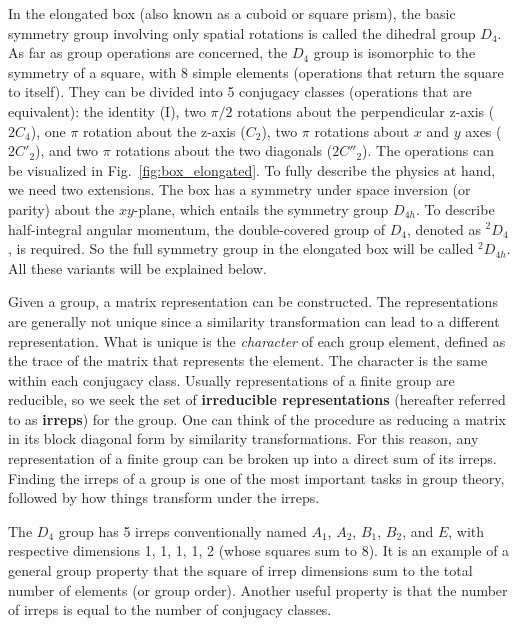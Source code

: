 \documentclass[aps,prd,reprint,showpacs,floatfix,longbibliography,,superscriptaddress]{revtex4-1}
\begin{document}
\begin{widetext}
In the elongated box (also known as a cuboid or square prism), 
the basic symmetry group involving only spatial rotations 
is called the dihedral group $D_4$. As far as group operations are concerned, 
the $D_4$ group is isomorphic to the symmetry of a square, with 8 simple elements (operations that 
return the square to itself). They can be divided into 5 conjugacy classes (operations that are equivalent): 
the identity (I), 
two $\pi/2$ rotations about the perpendicular z-axis ($2 C_4$), 
one $\pi$ rotation about the z-axis ($C_2$),  
two $\pi$  rotations about $x$ and $y$ axes ($2C'_2$), 
and  two $\pi$  rotations about the two diagonals  ($2C{''}_2$). 
The operations can be visualized in Fig.~\ref{fig:box_elongated}.
To fully describe the physics at hand, we need two extensions.
The box has a symmetry under space inversion (or parity) about the $xy$-plane, which entails the symmetry group $D_{4h}$. To describe half-integral angular momentum, the double-covered group of $D_4$, denoted as $^2D_4$, 
is required. So the full symmetry group in the elongated box will be called $^2D_{4h}$. 
All these variants will be explained below.

Given a group, a matrix representation can be constructed. The representations are generally not unique 
since a similarity transformation can lead to a different representation. What is unique is the {\em character} of each group element, defined as the trace of the matrix that represents the element. 
The character is the same within each conjugacy class.
Usually representations of a finite group are reducible, 
so we seek the set of  {\bf irreducible representations} (hereafter referred to as {\bf irreps}) for the group. One can think of the procedure as reducing a matrix in its block diagonal form by similarity transformations. For this reason, any representation of a finite group can be broken up into a direct sum of its irreps.
Finding the irreps of a group is one of the most important tasks in group theory, followed by how things transform under the irreps.

The $D_4$ group has 5 irreps conventionally named $A_1$,  $A_2$,  $B_1$, $B_2$, and $E$, 
with respective dimensions 1, 1, 1, 1, 2 (whose squares sum to 8). 
It is an example of a  general group property that the square of irrep dimensions sum 
to the total number of elements (or group order).  
Another useful property is that the number of irreps is equal to the number of conjugacy classes.


\end{widetext}
\end{document}
